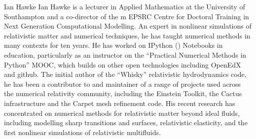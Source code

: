 \begin{participant}[PM=2,type=PI]{Ian Hawke}
%
Ian Hawke is a lecturer in Applied Mathematics at the University of
Southampton and a co-director of the m EPSRC Centre for Doctoral
Training in Next Generation Computational Modelling. An expert in
nonlinear simulations of relativistic matter and numerical techniques,
he has taught numerical methods in many contexts for ten years. He has
worked on IPython (\Jupyter{}) Notebooks in education, particularly as an
instructor on the ``Practical Numerical Methods in Python'' MOOC,
which builds on other open technologies including OpenEdX and github. The
initial author of the ``Whisky'' relativistic hydrodynamics code, he has
been a contributor to and maintainer of a range of projects used
across the numerical relativity community, including the Einstein
Toolkit, the Cactus infrastructure and the Carpet mesh refinement
code. His recent research has concentrated on numerical methods for
relativistic matter beyond ideal fluids, including modelling sharp
transitions and surfaces, relativistic elasticity, and the first
nonlinear simulations of relativistic multifluids.
%
\end{participant}


